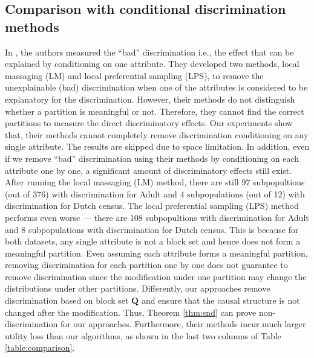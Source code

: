 \documentclass[twoside,leqno,twocolumn]{article}
\begin{document}
\subsection{Comparison with conditional discrimination methods}
In \cite{zliobaite2011handling}, the authors measured the ``bad'' discrimination i.e., the effect that can be explained by conditioning on one attribute. They developed two methods, local massaging (LM) and local preferential sampling (LPS), to remove the unexplainable (bad) discrimination when one of the attributes is considered to be explanatory for the discrimination. However, their methods do not distinguish whether a partition is meaningful or not. Therefore, they cannot find the correct partitions to measure the direct discriminatory effects. Our experiments show that, their methods cannot completely remove discrimination conditioning on any single attribute. The results are skipped due to space limitation. In addition, even if we remove ``bad'' discrimination using their methods by conditioning on each attribute one by one, a significant amount of discriminatory effects still exist. After running the local massaging (LM) method, there are still 97 subpopultions (out of 376) with discrimination for Adult and 4 subpopulations (out of 12) with discrimination for Dutch census. The local preferential sampling (LPS) method performs even worse --- there are 108 subpopultions with discrimination for Adult and 8 subpopulations with discrimination for Dutch census. This is because for both datasets, any single attribute is not a block set and hence does not form a meaningful partition. Even assuming each attribute forms a meaningful partition, removing discrimination for each partition one by one does not guarantee to remove discrimination since the modification under one partition may change the distributions under other partitions. Differently, our approaches remove discrimination based on block set $\mathbf{Q}$ and ensure that the causal structure is not changed after the modification. Thus, Theorem \ref{thm:snd} can prove non-discrimination for our approaches. Furthermore, their methods incur much larger utility loss than our algorithms, as shown in the last two columns of Table \ref{table:comparison}.

 
\end{document}

